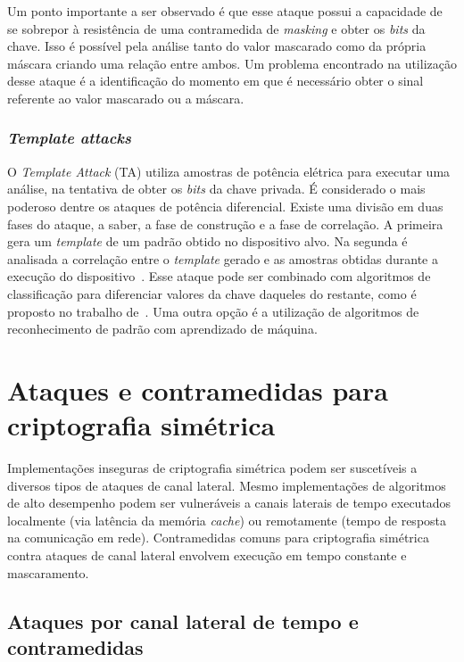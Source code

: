 \documentclass{SBCbookchapter}
\begin{document}
Um ponto importante a ser observado é que esse ataque possui a capacidade de se  sobrepor à resistência de uma contramedida de \textit{masking} e obter os \textit{bits} da chave. Isso é possível pela análise tanto do valor mascarado como da própria máscara criando uma relação entre ambos. Um problema encontrado na utilização desse ataque é a identificação do momento em que é necessário obter o sinal referente ao valor mascarado ou a máscara.

\subsubsection{\emph{Template attacks}}
O \textit{Template Attack} (TA) utiliza amostras de potência elétrica para executar uma análise, na tentativa de obter os \textit{bits} da chave privada. É  considerado o mais poderoso dentre os ataques de potência diferencial. Existe uma divisão em duas fases do ataque, a saber, a fase de construção e a fase de correlação. A primeira gera um \textit{template} de um padrão obtido no dispositivo alvo. Na segunda é analisada a correlação entre o \textit{template} gerado e as amostras obtidas durante a execução do dispositivo~\cite{ozgen:2016}. Esse ataque pode ser combinado com algoritmos de classificação para diferenciar valores da chave daqueles do restante, como é proposto no trabalho de~\cite{ozgen:2016}. Uma outra opção é a utilização de algoritmos de reconhecimento de padrão com aprendizado de máquina.


\section{Ataques e contramedidas para criptografia simétrica}

%
Implementações inseguras de criptografia simétrica podem ser suscetíveis a diversos tipos de ataques
de canal lateral. Mesmo implementações de algoritmos de alto desempenho podem ser vulneráveis a canais
laterais de tempo executados localmente (via latência da memória \emph{cache}) ou remotamente
(tempo de resposta na comunicação em rede). Contramedidas comuns para criptografia simétrica contra ataques de canal lateral
envolvem execução em tempo constante e mascaramento.

\subsection{Ataques por canal lateral de tempo e contramedidas}
\end{document}
